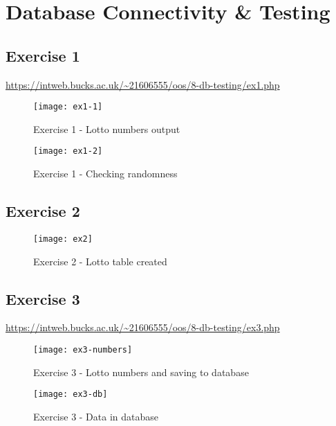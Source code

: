 \chapter{Database Connectivity \& Testing}
\graphicspath{{8-db-testing/images/}}

\section{Exercise 1}

\url{https://intweb.bucks.ac.uk/~21606555/oos/8-db-testing/ex1.php}

\captionsetup{type=figure}


\begin{figure}[H]
  \caption{Exercise 1 - Lotto numbers output}
  \centering
  \texttt{[image: ex1-1]}
\end{figure}

\begin{figure}[H]
  \caption{Exercise 1 - Checking randomness}
  \centering
  \texttt{[image: ex1-2]}
\end{figure}

\section{Exercise 2}

\begin{figure}[H]
  \caption{Exercise 2 - Lotto table created}
  \centering
  \texttt{[image: ex2]}
\end{figure}

\clearpage
\section{Exercise 3}

\url{https://intweb.bucks.ac.uk/~21606555/oos/8-db-testing/ex3.php}

\captionsetup{type=figure}


\begin{figure}[H]
  \caption{Exercise 3 - Lotto numbers and saving to database}
  \centering
  \texttt{[image: ex3-numbers]}
\end{figure}

\begin{figure}[H]
  \caption{Exercise 3 - Data in database}
  \centering
  \texttt{[image: ex3-db]}
\end{figure}

